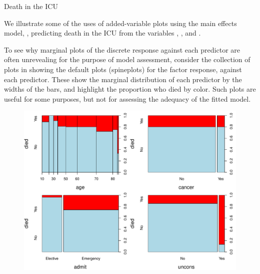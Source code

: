 \documentclass[11pt]{book}
\renewenvironment{knitrout}{\small\renewcommand{\baselinestretch}{.85}}{} %
\begin{document}
\begin{Example}[icu3]{Death in the ICU}

We illustrate some of the uses of added-variable plots using the main effects model, 
, predicting death in the ICU from the variables
, ,  and .

To see why marginal plots of the discrete response against each predictor are often
unrevealing for the purpose of model assessment, 
consider the collection of plots in 
showing the default plots (spineplots) for the factor response, 
against each predictor. These show the marginal distribution of each predictor
by the widths of the bars, and highlight the proportion who died by color.
Such plots are useful for some purposes, but not for assessing the adequacy of
the fitted model.

\begin{knitrout}
\color{fgcolor}\begin{kframe}
\begin{alltt}
 \hlkwb{<-} \hlstd{(}\hlstd{=}\hlstd{(}\hlstd{,}\hlstd{),} \hlstd{=}\hlstd{(}\hlstd{,}\hlstd{,}\hlstd{,}\hlstd{)}\hlopt{+}\hlstd{,} \hlstd{=}\hlstd{)}
 \hlopt{~}   \hlstd{=}\hlstd{(}\hlstd{,} \hlstd{))}
 \hlopt{~}   \hlstd{=}\hlstd{(}\hlstd{,} \hlstd{))}
 \hlopt{~}   \hlstd{=}\hlstd{(}\hlstd{,} \hlstd{))}
 \hlopt{~}   \hlstd{=}\hlstd{(}\hlstd{,} \hlstd{))}
\end{alltt}
\end{kframe}\begin{figure}[!htbp]


\centerline{\includegraphics[width=.8\textwidth]{ch07/fig/icu3-marginal} }


\end{figure}
\end{knitrout}
\end{Example}
\end{document}
